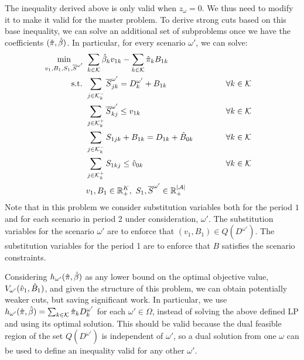 \documentclass[10pt]{article}
\newcommand{\ka}{k} %
\newcommand{\KA}{\mathcal{K}}
\newcommand{\Ka}{K}
\newcommand{\jey}{j} %
\newcommand{\Graf}{\mathcal{A}} %
\newcommand{\Bi}{B} %
\newcommand{\Vi}{v} %
\newcommand{\Es}{S} %
\newcommand{\Zed}{z} %
\newcommand{\m}{\omega} %
\newcommand{\EM}{\Omega} %
\newcommand{\x}{x} %
\newcommand{\Csub}{\mathcal{K}^+_k}
\newcommand{\Psub}{\mathcal{K}^-_k}
\newcommand{\Sc}{\overline{S}}
\begin{document}
The inequality derived above is only valid when $\Zed_\m = 0$. We thus need to modify it to make it valid for the master problem.
To derive strong cuts based on this base inequality, we can solve an additional set of subproblems once we have the coefficients $(\hat{\pi},\hat{\beta})$. In particular, for every scenario $\m'$, we can solve:
\begin{alignat}{2}
\min_{v_1,B_1,\Es_1,\Sc^{\m'}} \ & \sum_{\ka  \in \KA} \betasol_\ka \Vi_{1 \ka} - \sum_{\ka  \in \KA} \pisol_k \Bi_{1  \ka} \notag\\
\text{s.t. } &  \sum_{\jey \in  \Psub} \Sc^{\m'}_{\jey \ka } = D_{\ka}^{\m'} + \Bi_{1  \ka} \ &&\qquad \forall \ka  \in \KA \notag \\
    &\sum_{\jey \in  \Csub} \Sc^{\m'}_{\ka \jey } \leq \Vi_{1 \ka} \ && \qquad\forall \ka  \in \KA \notag \\
    & \sum_{\jey \in  \Psub} {S}_{1 \jey \ka} + \Bi_{1  \ka}  = D_{1 \ka} + \hat{\Bi}_{0 \ka} \quad && \qquad\forall \ka  \in \KA \notag\\
    & \sum_{\jey \in  \Csub} {S}_{1 \ka \jey} \leq \hat{\Vi}_{0 \ka}  && \qquad\forall \ka  \in \KA \notag\\
    & \Vi_1 , \Bi_1 \in \mathbb{R}_{+}^{\Ka}, \ \Es_1, \Sc^{\m'}  \in \mathbb{R}_+^{|\Graf|}  \notag
\end{alignat}
Note that in this problem we consider substitution variables both for the period $1$ and for each scenario in period 2 under consideration, $\m'$. The substitution variables for the scenario $\m'$ are to enforce that $(\Vi_1,\Bi_1) \in Q({D^{\m'}})$. The substitution variables for the period 1 are to enforce that $B$ satisfies the scenario constraints. 

{Considering $h_{\m'}(\pisol,\betasol)$ as any lower bound on the optimal objective value, $V_{\m'}(\vsol_1,\bsol_1)$, and given the structure of this problem, we can obtain potentially weaker cuts, but saving significant work. In particular, we use $h_{\m'}(\pisol,\betasol) = \sum_{\ka  \in \KA} \pisol_\ka D^{ \m'}_{\ka}$ for each $\m' \in \EM$, instead of solving the above defined LP and using its optimal solution.} This should be valid because the dual feasible region of the set $ Q(D^{\m'})$ is independent of $\m'$, so a dual solution from one $\m$ can be used to define an inequality valid for any other $\m'$.
\end{document}
